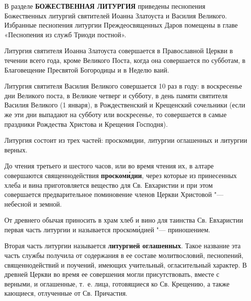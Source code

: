 

\label{_content_Liturgiya}

В разделе \textbf{БОЖЕСТВЕННАЯ ЛИТУРГИЯ} приведены песнопения Божественных литургий святителей Иоанна Златоуста и Василия Великого. Избранные песнопения литургии Преждеосвященных Даров помещены в главе «Песнопения из служб Триоди постной».

Литургия святителя Иоанна Златоуста совершается в Православной Церкви в течении всего года, кроме Великого Поста, когда она совершается по субботам, в Благовещение Пресвятой Богородицы и в Неделю ваий.

Литургия святителя Василия Великого совершается 10 раз в году: в воскресенье дни Великого поста, в Великие четверг и субботу, в день памяти святителя Василия Великого (1 января), в Рождественский и Крещенский сочельники (если же эти дни выпадают на субботу или воскресенье, то совершается в самые праздники Рождества Христова и Крещения Господня).

Литургия состоит из трех частей: проскомидии, литургии оглашенных и литургии верных.


До чтения третьего и шестого часов, или во время чтения их, в алтаре совершаются священнодействия \textbf{проском\'{и}дии}, через которые из принесенных хлеба и вина приготовляется вещество для Св. Евхаристии и при этом совершается предварительное поминовение членов Церкви Христовой "--- небесной и земной.

От древнего обычая приносить в храм хлеб и вино для таинства Св. Евхаристии первая часть литургии и называется проском\'{и}дией "--- приношением.

\mychapterending


Вторая часть литургии называется \textbf{литургией оглашенных}. Такое название эта часть службы получила от содержания в ее составе молитвословий, песнопений, священнодействий и поучений, имеющих учительный, огласительный характер. В древней Церкви во время ее совершения могли присутствовать, вместе с верными, и оглашенные, т.~е. лица, готовящиеся ко Св. Крещению, а также кающиеся, отлученные от Св. Причастия.

